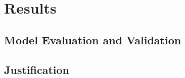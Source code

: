 \documentclass[paper=A4, DIV=calc, parskip=half]{scrartcl}
\begin{document}

\section*{Results}

\subsection*{Model Evaluation and Validation}


\subsection*{Justification}

\end{document}
